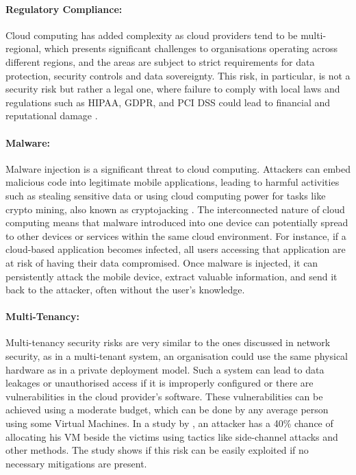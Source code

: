      
    \paragraph{Regulatory Compliance:} Cloud computing has added complexity as cloud providers tend to be multi-regional, which presents significant challenges to organisations operating across different regions, and the areas are subject to strict requirements for data protection, security controls and data sovereignty. This risk, in particular, is not a security risk but rather a legal one, where failure to comply with local laws and regulations such as HIPAA, GDPR, and PCI DSS could lead to financial and reputational damage \citep{legal_cloud_challenge}.
    

    
    \paragraph{Malware:} Malware injection is a significant threat to cloud computing. Attackers can embed malicious code into legitimate mobile applications, leading to harmful activities such as stealing sensitive data or using cloud computing power for tasks like crypto mining, also known as cryptojacking \citep{cryptojacking}. The interconnected nature of cloud computing means that malware introduced into one device can potentially spread to other devices or services within the same cloud environment. For instance, if a cloud-based application becomes infected, all users accessing that application are at risk of having their data compromised. Once malware is injected, it can persistently attack the mobile device, extract valuable information, and send it back to the attacker, often without the user's knowledge.


    
    \paragraph{Multi-Tenancy:} Multi-tenancy security risks are very similar to the ones discussed in network security, as in a multi-tenant system, an organisation could use the same physical hardware as in a private deployment model. Such a system can lead to data leakages or unauthorised access if it is improperly configured or there are vulnerabilities in the cloud provider's software. These vulnerabilities can be achieved using a moderate budget, which can be done by any average person using some Virtual Machines. In a study by \cite{multi_tenancy_cloud_risk}, an attacker has a 40\% chance of allocating his VM beside the victims using tactics like side-channel attacks and other methods. The study shows if this risk can be easily exploited if no necessary mitigations are present.


